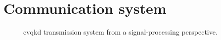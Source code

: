 \section{Communication system}


\begin{figure}[htb]
	\centering
	
	\caption{\Gls{cvqkd} transmission system from a signal-processing perspective.}
\end{figure}